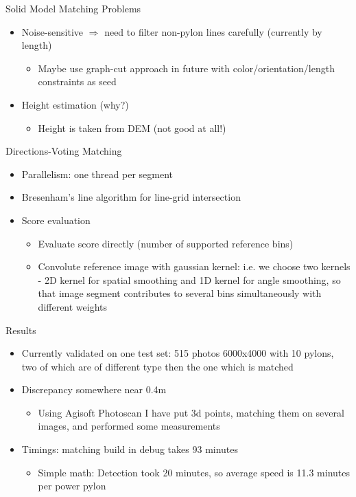 \documentclass{beamer}
\begin{document}
\begin{frame}[t, fragile]{Solid Model Matching Problems}
\begin{itemize}
\item Noise-sensitive $\Rightarrow$ need to filter non-pylon lines carefully (currently by length)
\begin{itemize}
\item Maybe use graph-cut approach in future with color/orientation/length constraints as seed
\end{itemize}
\item Height estimation (why?)
\begin{itemize}
\item Height is taken from DEM (not good at all!)
\end{itemize}
\end{itemize}
\end{frame}

\begin{frame}[t, fragile]{Directions-Voting Matching}
\begin{itemize}
\item Parallelism: one thread per segment
\item Bresenham's line algorithm for line-grid intersection
\item Score evaluation
\begin{itemize}
\item Evaluate score directly (number of supported reference bins)
\item Convolute reference image with gaussian kernel: i.e. we choose two kernels - 2D kernel for spatial smoothing and 1D kernel for angle smoothing, so that image segment contributes to several bins simultaneously with different weights
\end{itemize}
\end{itemize}
\end{frame}

\begin{frame}[t, fragile]{Results}
\begin{itemize}
\item Currently validated on one test set: 515 photos 6000x4000 with 10 pylons, two of which are of different type then the one which is matched
\item Discrepancy somewhere near 0.4m
\begin{itemize}
\item Using Agisoft Photoscan I have put 3d points, matching them on several images, and performed some measurements
\end{itemize}
\item Timings: matching build in debug takes 93 minutes
\begin{itemize}
\item Simple math: Detection took 20 minutes, so average speed is 11.3 minutes per power pylon
\end{itemize}
\end{itemize}
\end{frame}
\end{document}
